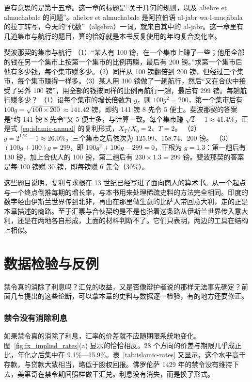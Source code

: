 更有意思的是第十五章。这一章的标题是“关于几何的规则，以及 aliebre et almuchabale 的问题”\cite{fibonacci1857}。aliebre et almuchabale 是阿拉伯语 al-jabr wa-l-muqābala 的拉丁转写，今天的“代数”（algebra）一词，就来自其中的 al-jabr。这一章里有几道集市与航行的题目，算的恰好就是本书反复使用的年均复合变化率。

\begin{example}{斐波那契的集市与航行}\label{ex:islamic-fibonacci}
（1）“某人有 100 镑，在一个集市上赚了一些；他用全部的钱在另一个集市上按第一个集市的比例再赚，最后有 200 镑。”求第一个集市后他有多少钱，每个集市赚多少。（2）同样从 100 镑翻倍到 200 镑，但经过三个集市，每个集市赚得一样多。（3）某人用 100 镑做了一趟航行，然后“又在合伙中接受了另外 100 镑”，用全部的钱按同样的比例再航行一趟，最后有 299 镑。每趟航行赚多少？\cite{fibonacci1857}
\solution （1）设每个集市的增长倍数为 $g$，则 $100g^2=200$，第一个集市后有 $100g=\sqrt{100\times200}\approx141.42$ 镑，即约 141 镑 8 先令 5 便士。斐波那契的答案是“约 141 镑 8 先令”又 5 便士多，与计算一致。每个集市赚 $\sqrt2-1\approx41.4\%$，正是式~\eqref{eq:islamic-annual} 的复利形式，$X_T/X_0=2$、$T=2$。
（2）$\bar g=2^{1/3}-1\approx26.0\%$，三个集市之后依次为 125.99、158.74、200 镑。
（3）$(100g+100)g=299$，即 $100g^2+100g-299=0$，正根为 $g=1.3$：第一趟后有 130 镑，加上合伙人的 100 镑，第二趟后有 $230\times1.3=299$ 镑。斐波那契的答案是每 100 镑赚 30 镑，即每镑赚 6 先令（30\%）。
\end{example}

这些题目说明，复利与求根在 13 世纪已经写进了面向商人的算术书。从一个起点与一个终点倒推每期的增长率，与本书用来处理稀疏史料的方法完全相同。印度的数字经由伊斯兰世界传到北非，再由在那里做生意的比萨人带回意大利，走的正是本章描述的商路。至于汇票与合伙契约是不是也沿着这条路从伊斯兰世界传入意大利，还是在两地各自形成，上面的材料判断不了。它们只表明，两边的工具在结构上相似。

\section{数据检验与反例}\label{sec:islamic-test}

禁令真的消除了利息吗？汇兑的收益，又是否像辩护者说的那样无法事先确定？前面几节提出的这些论断，可以拿本章的史料与数据逐一检验，有的地方还要修正。

\subsubsection{禁令没有消除利息}
如果禁令真的消除了利息，汇率的价差就不应随期限系统地变化。图~\ref{fig:fx_implied_rates}(a) 显示的恰恰相反。28 个方向的价差与期限几乎成正比，年化之后集中在 9.1\%—15.9\%。表~\ref{tab:islamic-rates} 又显示，这个水平高于存款，与贷款大致相当，略低于股权回报。佛罗伦萨 1429 年的禁令没有维持下去，美第奇在禁令期间照样做干汇兑。利息没有消失，而是换了形式。

